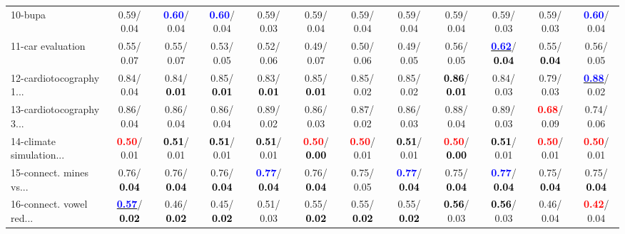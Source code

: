 \begin{table}[h]
\begin{center}
{\begin{tabular}{lc|c|c|c|c|c|c|c|c|c|c}
10-bupa &   0.59/  0.04 & \textcolor{blue}{\textbf{  0.60}}/  0.04 & \textcolor{blue}{\textbf{  0.60}}/  0.04 &   0.59/  0.03 &   0.59/  0.04 &   0.59/  0.04 &   0.59/  0.04 &   0.59/  0.04 &   0.59/  0.03 &   0.59/  0.03 & \textcolor{blue}{\textbf{  0.60}}/  0.04 \\
11-car evaluation &   0.55/  0.07 &   0.55/  0.07 &   0.53/  0.05 &   0.52/  0.06 &   0.49/  0.07 &   0.50/  0.06 &   0.49/  0.05 &   0.56/  0.05 & \underline{\textcolor{blue}{\textbf{  0.62}}}/\textcolor{black}{\textbf{  0.04}} &   0.55/\textcolor{black}{\textbf{  0.04}} &   0.56/  0.05 \\
12-cardiotocography 1... &   0.84/  0.04 &   0.84/\textcolor{black}{\textbf{  0.01}} &   0.85/\textcolor{black}{\textbf{  0.01}} &   0.83/\textcolor{black}{\textbf{  0.01}} &   0.85/\textcolor{black}{\textbf{  0.01}} &   0.85/  0.02 &   0.85/  0.02 & \textcolor{black}{\textbf{  0.86}}/\textcolor{black}{\textbf{  0.01}} &   0.84/  0.03 &   0.79/  0.03 & \underline{\textcolor{blue}{\textbf{  0.88}}}/  0.02 \\
13-cardiotocography 3... &   0.86/  0.04 &   0.86/  0.04 &   0.86/  0.04 &   0.89/  0.02 &   0.86/  0.03 &   0.87/  0.02 &   0.86/  0.03 &   0.88/  0.04 &   0.89/  0.03 & \textcolor{red}{\textbf{  0.68}}/  0.09 &   0.74/  0.06 \\
14-climate simulation... & \textcolor{red}{\textbf{  0.50}}/  0.01 & \textcolor{black}{\textbf{  0.51}}/  0.01 & \textcolor{black}{\textbf{  0.51}}/  0.01 & \textcolor{black}{\textbf{  0.51}}/  0.01 & \textcolor{red}{\textbf{  0.50}}/\textcolor{black}{\textbf{  0.00}} & \textcolor{red}{\textbf{  0.50}}/  0.01 & \textcolor{black}{\textbf{  0.51}}/  0.01 & \textcolor{red}{\textbf{  0.50}}/\textcolor{black}{\textbf{  0.00}} & \textcolor{black}{\textbf{  0.51}}/  0.01 & \textcolor{red}{\textbf{  0.50}}/  0.01 & \textcolor{red}{\textbf{  0.50}}/  0.01 \\ \hline
15-connect. mines vs... &   0.76/\textcolor{black}{\textbf{  0.04}} &   0.76/\textcolor{black}{\textbf{  0.04}} &   0.76/\textcolor{black}{\textbf{  0.04}} & \textcolor{blue}{\textbf{  0.77}}/\textcolor{black}{\textbf{  0.04}} &   0.76/\textcolor{black}{\textbf{  0.04}} &   0.75/  0.05 & \textcolor{blue}{\textbf{  0.77}}/\textcolor{black}{\textbf{  0.04}} &   0.75/\textcolor{black}{\textbf{  0.04}} & \textcolor{blue}{\textbf{  0.77}}/\textcolor{black}{\textbf{  0.04}} &   0.75/\textcolor{black}{\textbf{  0.04}} &   0.75/\textcolor{black}{\textbf{  0.04}} \\
16-connect. vowel red... & \underline{\textcolor{blue}{\textbf{  0.57}}}/\textcolor{black}{\textbf{  0.02}} &   0.46/\textcolor{black}{\textbf{  0.02}} &   0.45/\textcolor{black}{\textbf{  0.02}} &   0.51/  0.03 &   0.55/\textcolor{black}{\textbf{  0.02}} &   0.55/\textcolor{black}{\textbf{  0.02}} &   0.55/\textcolor{black}{\textbf{  0.02}} & \textcolor{black}{\textbf{  0.56}}/  0.03 & \textcolor{black}{\textbf{  0.56}}/  0.03 &   0.46/  0.04 & \textcolor{red}{\textbf{  0.42}}/  0.04 \\

\end{tabular}}
\end{center}
\end{table}
